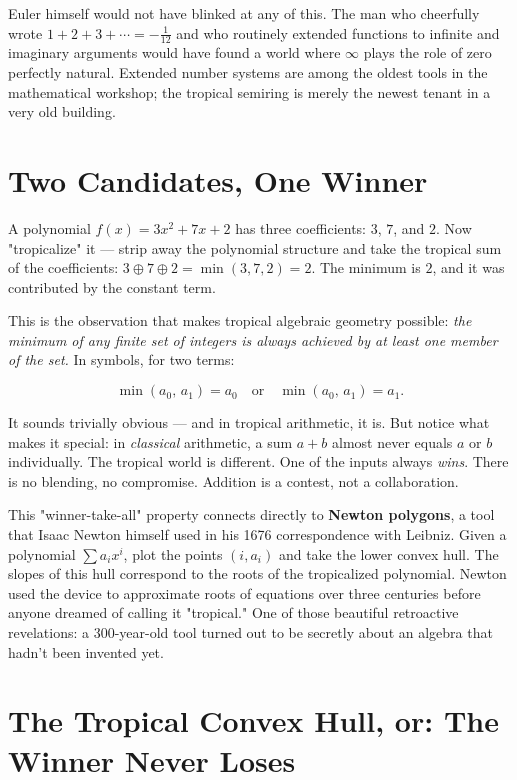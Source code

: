 \documentclass[11pt,twoside,openright]{book}
\theoremstyle{definition}
\theoremstyle{remark}
\begin{document}
Euler himself would not have blinked at any of this. The man who cheerfully wrote $1 + 2 + 3 + \cdots = -\tfrac{1}{12}$ and who routinely extended functions to infinite and imaginary arguments would have found a world where $\infty$ plays the role of zero perfectly natural. Extended number systems are among the oldest tools in the mathematical workshop; the tropical semiring is merely the newest tenant in a very old building.


\section{Two Candidates, One Winner}

A polynomial $f(x) = 3x^2 + 7x + 2$ has three coefficients: $3$, $7$, and $2$. Now "tropicalize" it --- strip away the polynomial structure and take the tropical sum of the coefficients: $3 \oplus 7 \oplus 2 = \min(3, 7, 2) = 2$. The minimum is $2$, and it was contributed by the constant term.

This is the observation that makes tropical algebraic geometry possible: \textit{the minimum of any finite set of integers is always achieved by at least one member of the set.} In symbols, for two terms:

\[\min(a_0,\, a_1) = a_0 \quad \text{or} \quad \min(a_0,\, a_1) = a_1.\]

It sounds trivially obvious --- and in tropical arithmetic, it is. But notice what makes it special: in \textit{classical} arithmetic, a sum $a + b$ almost never equals $a$ or $b$ individually. The tropical world is different. One of the inputs always \textit{wins}. There is no blending, no compromise. Addition is a contest, not a collaboration.


This "winner-take-all" property connects directly to \textbf{Newton polygons}, a tool that Isaac Newton himself used in his 1676 correspondence with Leibniz. Given a polynomial $\sum a_i x^i$, plot the points $(i, a_i)$ and take the lower convex hull. The slopes of this hull correspond to the roots of the tropicalized polynomial. Newton used the device to approximate roots of equations over three centuries before anyone dreamed of calling it "tropical." One of those beautiful retroactive revelations: a 300-year-old tool turned out to be secretly about an algebra that hadn't been invented yet.


\section{The Tropical Convex Hull, or: The Winner Never Loses}
\end{document}
